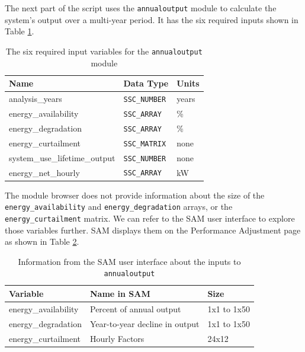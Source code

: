 \documentclass{scrartcl} %
\newcommand{\+}{\discretionary{\mbox{\scriptsize$\hookleftarrow$}}{}{}}
\begin{document}
The next part of the script uses the \texttt{annualoutput} module to calculate the system's output over a multi-year period. It has the six required inputs shown in Table \ref{tab_annualoutput}.

\begin{table}[ht]
\begin{center}
\begin{tabular}{lll}
Name & Data Type & Units \\
\hline
analysis\_years & \texttt{SSC\_NUMBER} & years \\
energy\_availability & \texttt{SSC\_ARRAY} & \% \\
energy\_degradation & \texttt{SSC\_ARRAY} & \% \\
energy\_curtailment & \texttt{SSC\_MATRIX} & none \\
system\_use\_lifetime\_output & \texttt{SSC\_NUMBER} &  none \\
energy\_net\_hourly & \texttt{SSC\_ARRAY} &  kW \\
\end{tabular}
\caption{The six required input variables for the \texttt{annualoutput} module}\label{tab_annualoutput}
\end{center}
\end{table}

The module browser does not provide information about the size of the \texttt{energy\_availability} and \texttt{energy\_degradation} arrays, or the \texttt{energy\_curtailment} matrix. We can refer to the SAM user interface to explore those variables further. SAM displays them on the Performance Adjustment page as shown in Table \ref{tab_performance_adjustment}.

 \begin{table}[ht]
\begin{center}
\begin{tabular}{lll}
Variable & Name in SAM & Size \\
\hline
energy\_availability & Percent of annual output & 1x1 to 1x50 \\
energy\_degradation & Year-to-year decline in output & 1x1 to 1x50 \\
energy\_curtailment & Hourly Factors & 24x12 \\
\end{tabular}
\caption{Information from the SAM user interface about the inputs to \texttt{annualoutput}}\label{tab_performance_adjustment}
\end{center}
\end{table}
\end{document}

